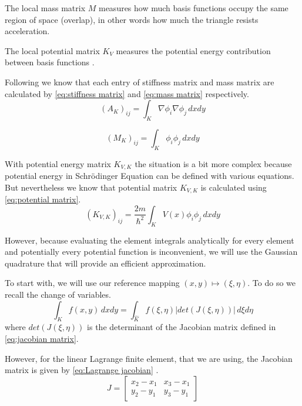 \documentclass[conference]{IEEEtran}
\begin{document}
The local mass matrix $M$ measures how much basis functions occupy the same region of space (overlap), in other words how much the triangle resists acceleration.

The local potential matrix $K_V$ measures the potential energy contribution between basis functions \cite{b15}.

Following \cite{b10} we know that each entry of stiffness matrix and mass matrix are calculated by \ref{eq:stiffness matrix} and \ref{eq:mass matrix} respectively.
\begin{equation}
    (A_K)_{ij} = \int_K \nabla \phi_i \nabla \phi_j \, dxdy
    \label{eq:stiffness matrix}
\end{equation}

\begin{equation}
    (M_K)_{ij} = \int_K \phi_i \phi_j \, dxdy
    \label{eq:mass matrix}
\end{equation}

With potential energy matrix $K_{V,K}$ the situation is a bit more complex because potential energy in Schr\"{o}dinger Equation can be defined with various equations. But nevertheless we know that potential matrix $K_{V,K}$ is calculated using \ref{eq:potential matrix}.
\begin{equation}
    (K_{V,K})_{ij} = \frac{2m}{\hbar^2}\int_K V(x) \phi_i \phi_j \, dxdy
    \label{eq:potential matrix}
\end{equation}

However, because evaluating the element integrals analytically for every element and potentially every potential function is inconvenient, we will use the Gaussian quadrature that will provide an efficient approximation.

To start with, we will use our reference mapping $(x, y) \mapsto (\xi, \eta)$. To do so we recall the change of variables.
\begin{equation}
    \int_K f(x, y) \, dxdy = \int_{\hat{K}}f(\xi, \eta) |det(J(\xi, \eta))| \, d\xi d\eta
    \label{eq:from physical to reference}
\end{equation}
where $det(J(\xi, \eta))$ is the determinant of the Jacobian matrix defined in \ref{eq:jacobian matrix}.

However, for the linear Lagrange finite element, that we are using, the Jacobian matrix is given by \ref{eq:Lagrange jacobian} \cite{b10}.
\begin{equation}
    J = \begin{bmatrix}
        x_2 - x_1 & x_3 - x_1 \\
        y_2 - y_1 & y_3 - y_1
    \end{bmatrix}
    \label{eq:Lagrange jacobian}
\end{equation}
\end{document}

